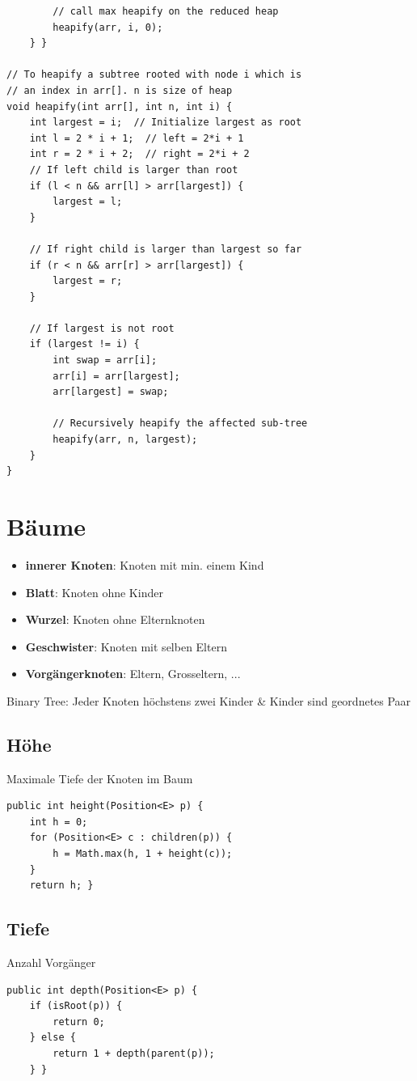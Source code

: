 \begin{multicols*}{4}
\begin{lstlisting}
		// call max heapify on the reduced heap 
		heapify(arr, i, 0); 
	} } 

// To heapify a subtree rooted with node i which is 
// an index in arr[]. n is size of heap 
void heapify(int arr[], int n, int i) { 
	int largest = i;  // Initialize largest as root 
	int l = 2 * i + 1;  // left = 2*i + 1 
	int r = 2 * i + 2;  // right = 2*i + 2 
	// If left child is larger than root 
	if (l < n && arr[l] > arr[largest]) {
		largest = l; 
	}
	
	// If right child is larger than largest so far 
	if (r < n && arr[r] > arr[largest]) {
		largest = r; 
	}
	
	// If largest is not root 
	if (largest != i) { 
		int swap = arr[i]; 
		arr[i] = arr[largest]; 
		arr[largest] = swap; 
		
		// Recursively heapify the affected sub-tree 
		heapify(arr, n, largest); 
	} 
} 
			\end{lstlisting}

\columnbreak
		
\section{Bäume}
	\begin{itemize}
		\item \textbf{innerer Knoten}: Knoten mit min. einem Kind
		\item \textbf{Blatt}: Knoten ohne Kinder
		\item \textbf{Wurzel}: Knoten ohne Elternknoten
		\item \textbf{Geschwister}: Knoten mit selben Eltern
		\item \textbf{Vorgängerknoten}: Eltern, Grosseltern, ...
	\end{itemize}

	Binary Tree: Jeder Knoten höchstens zwei Kinder \& Kinder sind geordnetes Paar

	\subsection{Höhe}
	Maximale Tiefe der Knoten im Baum
		\begin{lstlisting}
public int height(Position<E> p) {
	int h = 0;
	for (Position<E> c : children(p)) {
		h = Math.max(h, 1 + height(c));
	}
	return h; }
		\end{lstlisting}
	
	\subsection{Tiefe}
	Anzahl Vorgänger
		\begin{lstlisting}
public int depth(Position<E> p) {
	if (isRoot(p)) {
		return 0;
	} else {
		return 1 + depth(parent(p));
	} }
		\end{lstlisting}

\end{multicols*}
